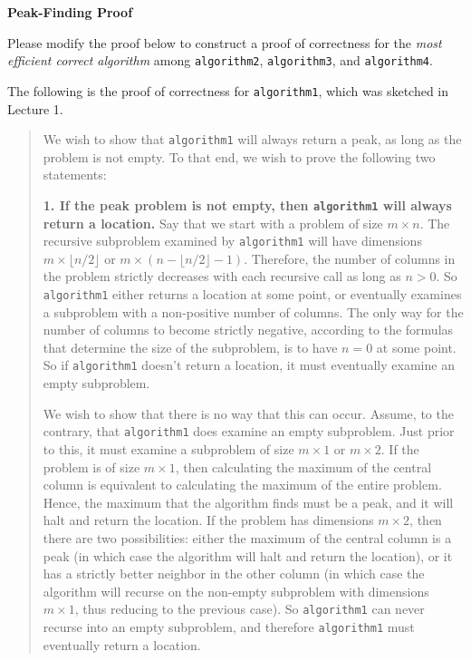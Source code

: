 \documentclass[12pt,twoside]{article}
\begin{document}
\begin{exercises}
\problem {} \textbf{Peak-Finding Proof}

Please modify the proof below to construct a proof of correctness
for the \emph{most efficient correct algorithm}
among \texttt{algorithm2}, \texttt{algorithm3}, and \texttt{algorithm4}.

The following is the proof of correctness
for \texttt{algorithm1},
which was sketched in Lecture 1.

\begin{quote}
We wish to show that \texttt{algorithm1}
will always return a peak,
as long as the problem is not empty.
To that end,
we wish to prove the following two statements:

{\bf 1. If the peak problem is not empty,
then \texttt{algorithm1} will always return a location.}
Say that we start with a problem of size $m \times n$.
The recursive subproblem examined by \texttt{algorithm1}
will have dimensions
$m \times \lfloor n / 2 \rfloor$ or 
$m \times \left(n - \lfloor n / 2 \rfloor - 1 \right)$.
Therefore, the number of columns in the problem
strictly decreases with each recursive call
as long as $n > 0$.
So \texttt{algorithm1} either returns a location at some point,
or eventually examines a subproblem with a non-positive
number of columns.
The only way for the number of columns to become strictly negative,
according to the formulas that determine the size of the subproblem,
is to have $n = 0$ at some point.
So if \texttt{algorithm1} doesn't return a location,
it must eventually examine an empty subproblem.

We wish to show that there is no way that this can occur.
Assume, to the contrary,
that \texttt{algorithm1} does examine an empty subproblem.
Just prior to this,
it must examine a subproblem of size
$m \times 1$ or $m \times 2$.
If the problem is of size $m \times 1$,
then calculating the maximum of the central column
is equivalent to calculating the maximum of the entire problem.
Hence, the maximum that the algorithm finds must be a peak,
and it will halt and return the location.
If the problem has dimensions $m \times 2$,
then there are two possibilities:
either the maximum of the central column is a peak
(in which case the algorithm will halt and return the location),
or it has a strictly better neighbor in the other column
(in which case the algorithm will recurse
on the non-empty subproblem with dimensions $m \times 1$,
thus reducing to the previous case).
So \texttt{algorithm1} can never recurse into an empty subproblem,
and therefore \texttt{algorithm1} must eventually return a location.


\end{quote}
\end{exercises}
\end{document}
